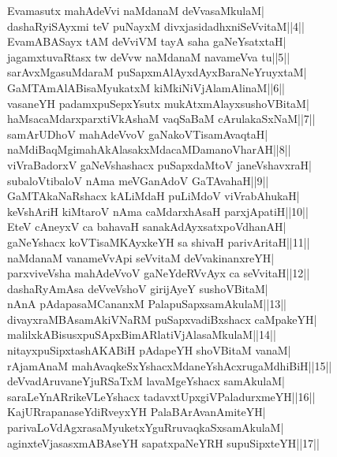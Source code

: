 \documentclass{article}
\begin{document}
Evamasutx mahAdeVvi naMdanaM deVvasaMkulaM|\\
dashaRyiSAyxmi teV puNayxM divxjasidadhxniSeVvitaM||4||\\
EvamABASayx tAM deVviVM tayA saha  gaNeYsatxtaH|\\
jagamxtuvaRtasx tw deVvw naMdanaM navameVva tu||5||\\
sarAvxMgasuMdaraM puSapxmAlAyxdAyxBaraNeYruyxtaM|\\
GaMTAmAlABisaMyukatxM kiMkiNiVjAlamAlinaM||6||\\
vasaneYH padamxpuSepxYsutx mukAtxmAlayxsushoVBitaM|\\
haMsacaMdarxparxtiVkAshaM vaqSaBaM cArulakaSxNaM||7||\\
samArUDhoV mahAdeVvoV gaNakoVTisamAvaqtaH|\\
naMdiBaqMgimahAkAlasakxMdacaMDamanoVharAH||8||\\
viVraBadorxV gaNeVshashacx puSapxdaMtoV janeVshavxraH|\\
subaloVtibaloV nAma meVGanAdoV GaTAvahaH||9||\\
GaMTAkaNaRshacx kALiMdaH puLiMdoV viVrabAhukaH|\\
keVshAriH kiMtaroV nAma caMdarxhAsaH parxjApatiH||10||\\
EteV cAneyxV ca bahavaH sanakAdAyxsatxpoVdhanAH|\\
gaNeYshacx koVTisaMKAyxkeYH sa shivaH parivAritaH||11||\\
naMdanaM vanameVvApi seVvitaM deVvakinanxreYH|\\
parxviveVsha mahAdeVvoV gaNeYdeRVvAyx ca seVvitaH||12||\\
dashaRyAmAsa deVveVshoV girijAyeY sushoVBitaM|\\
nAnA pAdapasaMCananxM PalapuSapxsamAkulaM||13||\\
divayxraMBAsamAkiVNaRM puSapxvadiBxshacx caMpakeYH|\\
malilxkABisusxpuSApxBimARlatiVjAlasaMkulaM||14||\\
nitayxpuSipxtashAKABiH pAdapeYH shoVBitaM vanaM|\\
rAjamAnaM mahAvaqkeSxYshacxMdaneYshAcxrugaMdhiBiH||15||\\
deVvadAruvaneYjuRSaTxM lavaMgeYshacx samAkulaM|\\
saraLeYnARrikeVLeYshacx tadavxtUpxgiVPaladurxmeYH||16||\\
KajURrapanaseYdiRveyxYH PalaBArAvanAmiteYH|\\
parivaLoVdAgxrasaMyuketxYguRruvaqkaSxsamAkulaM|\\
aginxteVjasasxmABAseYH sapatxpaNeYRH supuSipxteYH||17||\\
\end{document}
